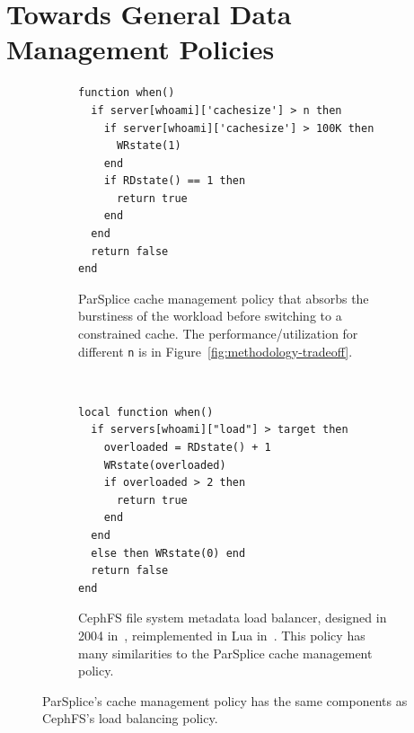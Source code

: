\section{Towards General Data Management Policies}
\label{sec:scope}

\begin{figure}[t!]
    \centering
    \begin{subfigure}[t]{0.48\textwidth}
        \centering
        \footnotesize
        \centering
        \begin{verbatim}
function when()
  if server[whoami]['cachesize'] > n then
    if server[whoami]['cachesize'] > 100K then
      WRstate(1)
    end
    if RDstate() == 1 then
      return true
    end
  end
  return false
end
        \end{verbatim}
        \caption{ParSplice cache management policy that absorbs the burstiness of the
        workload before switching to a constrained cache.  The
        performance/utilization for different  \texttt{n} is in
        Figure~\ref{fig:methodology-tradeoff}. \label{src:lru-dyn}}
    \end{subfigure}%
    ~ 
    \begin{subfigure}[t]{0.48\textwidth}
        \centering
        \footnotesize
        \begin{verbatim}
local function when()
  if servers[whoami]["load"] > target then
    overloaded = RDstate() + 1
    WRstate(overloaded)
    if overloaded > 2 then
      return true
    end
  end
  else then WRstate(0) end
  return false
end
        \end{verbatim}
	\caption{CephFS file system metadata load balancer, designed in 2004
        in~\cite{weil:sc2004-dyn-metadata}, reimplemented in Lua
        in~\cite{sevilla:sc15-mantle}. This policy has many similarities to the
        ParSplice cache management policy.\label{src:lua-cephfs}}
    \end{subfigure}
    \caption{ParSplice's cache management policy has the same components as
    CephFS's load balancing policy.}
\end{figure}





